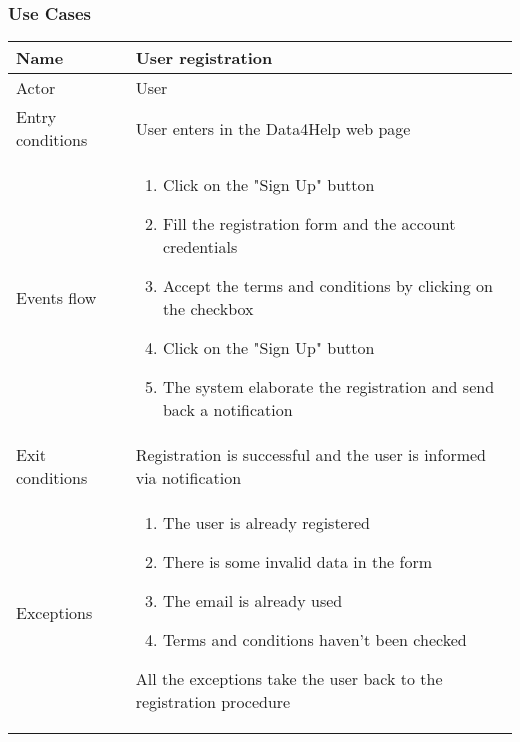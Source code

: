 \newpage
\subsubsection{Use Cases}

\begin{table}[h!]
\begin{tabular}{|l|p{12cm}|}
\hline
Name             & User registration \\ \hline
Actor            & User \\ \hline
Entry conditions & User enters in the Data4Help web page \\ \hline
Events flow      & \begin{enumerate}
\item Click on the "Sign Up" button
\item Fill the registration form and the account credentials
\item Accept the terms and conditions by clicking on the checkbox 
\item Click on the "Sign Up" button
\item The system elaborate the registration and send back a notification
\end{enumerate} 
\\ \hline
Exit conditions  & Registration is successful and the user is informed via notification \\ \hline
Exceptions       & \begin{enumerate}
\item The user is already registered
\item There is some invalid data in the form
\item The email is already used
\item Terms and conditions haven't been checked
\end{enumerate} All the exceptions take the user back to the registration procedure \\ \hline
\end{tabular}
\end{table}

